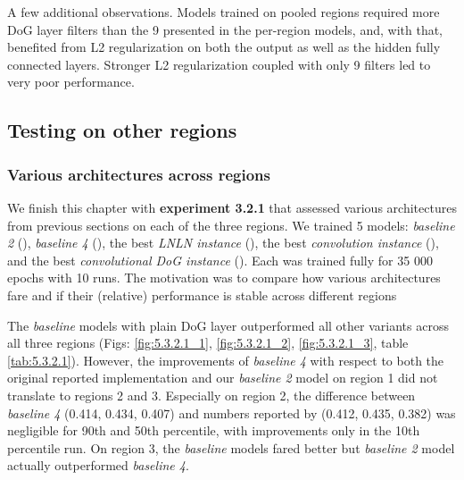 A few additional observations. Models trained on pooled regions required more DoG layer filters than the 9 presented in the per-region models, and, with that, benefited from L2 regularization on both the output as well as the hidden fully connected layers. Stronger L2 regularization coupled with only 9 filters led to very poor performance. 

\subsection{Testing on other regions}\label{ch:5.3.2}
\subsubsection{Various architectures across regions}

We finish this chapter with \textbf{experiment 3.2.1} that assessed various architectures from previous sections on each of the three regions. We trained 5 models: \textit{baseline 2} (), \textit{baseline 4} (), the best \textit{LNLN instance} (), the best \textit{convolution instance} (), and the best \textit{convolutional DoG instance} (). Each was trained fully for 35 000 epochs with 10 runs. The motivation was to compare how various architectures fare and if their (relative) performance is stable across different regions

The \textit{baseline} models with plain DoG layer outperformed all other variants across all three regions (Figs: \ref{fig:5.3.2.1_1}, \ref{fig:5.3.2.1_2}, \ref{fig:5.3.2.1_3}, table \ref{tab:5.3.2.1}). However, the improvements of \textit{baseline 4} with respect to both the original reported \citeauthor{antolik} implementation and our \textit{baseline 2} model on {region 1} did not translate to {regions 2} and {3}. Especially on {region 2}, the difference between \textit{baseline 4} (0.414, 0.434, 0.407) and numbers reported by \citeauthor{antolik} (0.412, 0.435, 0.382) was negligible for 90th and 50th percentile, with improvements only in the 10th percentile run. On region 3, the \textit{baseline} models fared better but \textit{baseline 2} model actually outperformed \textit{baseline 4}.

